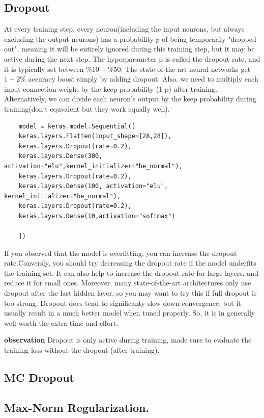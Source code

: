 \documentclass[12pt, a4paper]{book}
\begin{document}
\subsection*{Dropout}
At every training step, every neuron(including the input neurons, but always excluding the output neurons) has a probability $p$ of being temporarily "dropped out", meaning it will be entirely ignored during this training step, but it may be active during the next step. The hyperparameter p is called the dropout rate, and it is typically set between $\%10-\%50$. The state-of-the-art neural networks get $1-2\%$ accuracy boost simply by adding dropout. Also. we need to multiply each input connection weight by the keep probability (1-p) after training. Alternatively, we can divide each neuron's output by the keep probability during training(don't equvalent but they work equally well).
\begin{verbatim}
	model = keras.model.Sequential([
	keras.layers.Flatten(input_shape=[28,28]),
	keras.layers.Dropout(rate=0.2),
	keras.layers.Dense(300, activation="elu",kernel_initializer="he_normal"),
	keras.layers.Dropout(rate=0.2),
	keras.layers.Dense(100, activation="elu", kernel_initializer="he_normal"),
	keras.layers.Dropout(rate=0.2),
	keras.layers.Dense(10,activation="softmax")
	
	])
\end{verbatim}
If you observed that the model is overfitting, you can increase the dropout rate.Conversly, you should try decreasing the dropout rate if the model  underfits the training set. It can also help to increase the dropout rate for large layers, and reduce it for small ones. Moreover, many state-of-the-art architectures only use dropout after the last hidden layer, so you may want to try this if full dropout is too strong. Dropout does tend to significanty slow down convergence, but it usually result in a much better model when tuned properly. So, it is in generally well worth the extra time and effort.

\textbf{observation} Dropout is only active during training, made sure to evaluate the training loss without the dropout (after training).

\subsection*{MC Dropout}
\subsection*{Max-Norm Regularization.}
\end{document}
